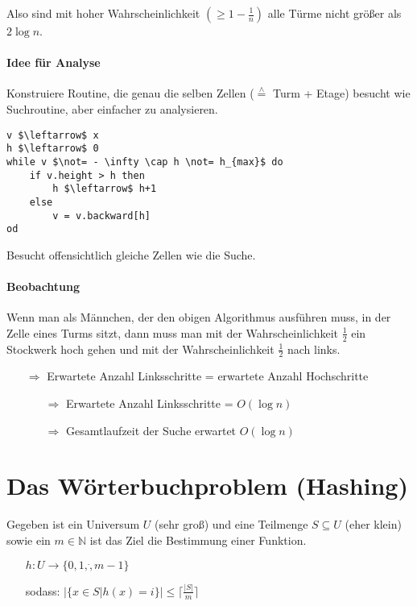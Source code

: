 
\par\medskip
Also sind mit hoher Wahrscheinlichkeit $(\geq 1 - \frac{1}{n})$ alle Türme nicht größer als $2 \log n$.\par\medskip

\paragraph*{Idee für Analyse} Konstruiere Routine, die genau die selben Zellen ($\overset{\wedge}{=}$ Turm + Etage) besucht wie Suchroutine, aber einfacher zu analysieren.


\begin{lstlisting}[mathescape]
v $\leftarrow$ x
h $\leftarrow$ 0
while v $\not= - \infty \cap h \not= h_{max}$ do
	if v.height > h then
		h $\leftarrow$ h+1
	else
		v = v.backward[h]
od
\end{lstlisting}

\par\medskip
Besucht offensichtlich gleiche Zellen wie die Suche.\par\medskip

\paragraph*{Beobachtung} Wenn man als Männchen, der den obigen Algorithmus ausführen muss, in der Zelle eines Turms sitzt, dann muss man mit der Wahrscheinlichkeit $\frac{1}{2}$ ein Stockwerk hoch gehen und mit der Wahrscheinlichkeit $\frac{1}{2}$ nach links.
\begin{itemize}
	\item[$\Rightarrow$] Erwartete Anzahl Linksschritte = erwartete Anzahl Hochschritte
	\begin{itemize}
		\item[$\Rightarrow$] Erwartete Anzahl Linksschritte = $O(\log n)$
		\item[$\Rightarrow$] Gesamtlaufzeit der Suche erwartet $O(\log n)$
	\end{itemize}
\end{itemize}

\section{Das Wörterbuchproblem (Hashing)}
Gegeben ist ein Universum $U$ (sehr groß) und eine Teilmenge $S \subseteq U$ (eher klein) sowie ein $m \in \mathbb{N}$ ist das Ziel die Bestimmung einer Funktion.
\begin{itemize}
	\item[] $h : U \rightarrow \{ 0,1,\dot,m-1 \}$
	\item[]sodass: $\big| \{ x \in S | h(x) =i \} \big| \leq \lceil\frac{|S|}{m}\rceil $
\end{itemize}

